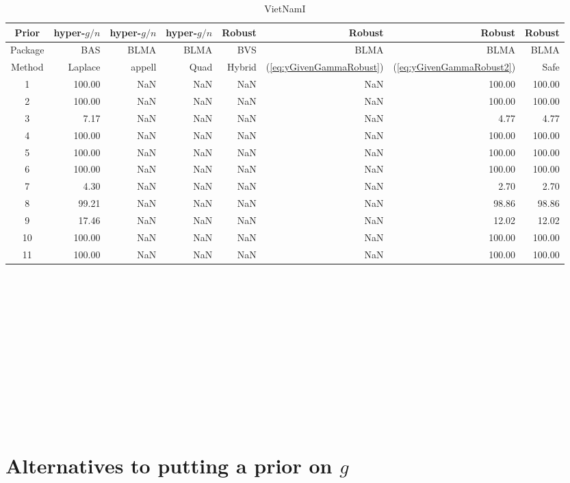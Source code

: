 \documentclass{article}[12pt]
\begin{document}
\begin{table}[ht]
	\centering
	\centering
	\begin{tabular}{c|rrr|rrrr}
		Prior   & hyper-$g/n$ & hyper-$g/n$ & hyper-$g/n$ & Robust &  Robust & Robust & Robust \\		
		\hline
		Package & BAS         & BLMA        & BLMA        & BVS & BLMA & BLMA & BLMA  \\
		\hline 
		Method  & Laplace     & appell      & Quad  & Hybrid & (\ref{eq:yGivenGammaRobust}) & (\ref{eq:yGivenGammaRobust2}) & Safe \\ 
		\hline
		1 & 100.00 & NaN & NaN & NaN & NaN & 100.00 & 100.00 \\ 
		2 & 100.00 & NaN & NaN & NaN & NaN & 100.00 & 100.00 \\ 
		3 & 7.17 & NaN & NaN & NaN & NaN & 4.77 & 4.77 \\ 
		4 & 100.00 & NaN & NaN & NaN & NaN & 100.00 & 100.00 \\ 
		5 & 100.00 & NaN & NaN & NaN & NaN & 100.00 & 100.00 \\ 
		6 & 100.00 & NaN & NaN & NaN  & NaN  & 100.00 & 100.00 \\ 
		7 & 4.30 & NaN & NaN &NaN  & NaN & 2.70 & 2.70 \\ 
		8 & 99.21 & NaN & NaN & NaN & NaN  & 98.86 & 98.86 \\ 
		9 & 17.46 & NaN & NaN & NaN & NaN & 12.02 & 12.02 \\ 
		10 & 100.00 & NaN & NaN & NaN & NaN & 100.00 & 100.00 \\ 
		11 & 100.00 & NaN & NaN & NaN & NaN & 100.00 & 100.00 \\ 
		\hline
	\end{tabular}
	\caption{VietNamI}
	\label{tab:VietNamIResults2}
\end{table}



\newpage 

\

\newpage 

\

\newpage \

\newpage \

\newpage \

\newpage \

\newpage \

\newpage 

\section{Alternatives to putting a prior on $g$}
\label{sec:MarginalLikelihood}
\end{document}
